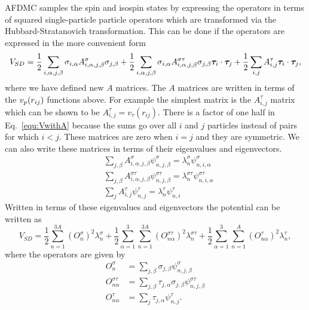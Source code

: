 AFDMC samples the spin and isospin states by expressing the operators in terms of squared single-particle particle operators which are transformed via the Hubbard-Stratanovich transformation. This can be done if the operators are expressed in the more convenient form
\begin{equation}
   V_{SD} = \frac{1}{2}\sum\limits_{i,\alpha,j,\beta} \sigma_{i,\alpha}A^{\sigma}_{i,\alpha,j,\beta}\sigma_{j,\beta}
      + \frac{1}{2}\sum\limits_{i,\alpha,j,\beta} \sigma_{i,\alpha}A^{\sigma\tau}_{i,\alpha,j,\beta}\sigma_{j,\beta}\bm{\tau}_i\cdot\bm{\tau}_j
      + \frac{1}{2}\sum\limits_{i,j} A^{\tau}_{i,j}\bm{\tau}_i\cdot\bm{\tau}_j,
   \label{equ:VwithA}
\end{equation}
where we have defined new $A$ matrices. The $A$ matrices are written in terms of the $v_p(r_{ij})$ functions above. For example the simplest matrix is the $A^{\tau}_{i,j}$ matrix which can be shown to be $A^{\tau}_{i,j} = v_{\tau}(r_{ij})$. There is a factor of one half in Eq.~\ref{equ:VwithA} because the sums go over all $i$ and $j$ particles instead of pairs for which $i<j$. These matrices are zero when $i=j$ and they are symmetric. We can also write these matrices in terms of their eigenvalues and eigenvectors.
\begin{align}
   &\sum\limits_{j,\beta} A^{\sigma}_{i,\alpha,j,\beta}\psi^{\sigma}_{n,j,\beta} = \lambda^{\sigma}_n\psi^{\sigma}_{n,i,\alpha} \\
   &\sum\limits_{j,\beta} A^{\sigma\tau}_{i,\alpha,j,\beta}\psi^{\sigma\tau}_{n,j,\beta} = \lambda^{\sigma\tau}_n\psi^{\sigma\tau}_{n,i,\alpha} \\
   &\sum\limits_{j} A^{\tau}_{i,j}\psi^{\tau}_{n,j} = \lambda^{\tau}_n\psi^{\tau}_{n,i}
\end{align}
Written in terms of these eigenvalues and eigenvectors the potential can be written as
\begin{equation}
   V_{SD} = \frac{1}{2}\sum\limits_{n=1}^{3A} \left(O_{n}^{\sigma}\right)^2 \lambda_n^{\sigma}
      + \frac{1}{2}\sum\limits_{\alpha=1}^{3}\sum\limits_{n=1}^{3A} \left(O_{n\alpha}^{\sigma\tau}\right)^2 \lambda_n^{\sigma\tau}
      + \frac{1}{2}\sum\limits_{\alpha=1}^{3}\sum\limits_{n=1}^{A} \left(O_{n\alpha}^{\tau}\right)^2 \lambda_n^{\tau},
\end{equation}
where the operators are given by
\begin{equation}
\begin{split}
   O_{n}^{\sigma} &= \sum\limits_{j,\beta} \sigma_{j,\beta}\psi_{n,j,\beta}^{\sigma} \\
   O_{n\alpha}^{\sigma\tau} &= \sum\limits_{j,\beta} \tau_{j,\alpha}\sigma_{j,\beta}\psi_{n,j,\beta}^{\sigma\tau} \\
   O_{n\alpha}^{\tau} &= \sum\limits_{j} \tau_{j,\alpha}\psi_{n,j}^{\tau}.
\end{split}
\end{equation}
